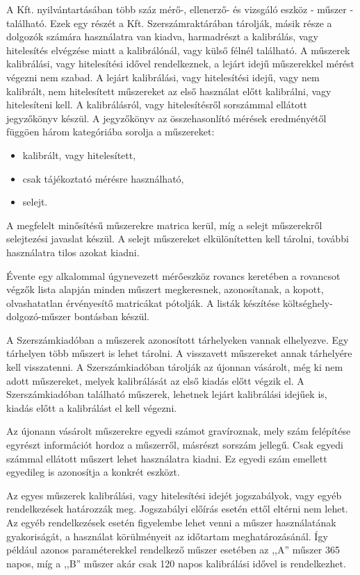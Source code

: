\documentclass[a4paper,12pt]{report}
\begin{document}
A Kft. nyilvántartásában több száz mérő-, ellenerző- és vizsgáló eszköz 
- műszer - található. Ezek egy részét a Kft. Szerszámraktárában tárolják, másik 
része a dolgozók számára használatra van kiadva, harmadrészt a kalibrálás, vagy 
hitelesítés elvégzése miatt a kalibrálónál, vagy külső félnél található. 
A műszerek kalibrálási, vagy hitelesítési idővel rendelkeznek, a lejárt idejű 
műszerekkel mérést végezni nem szabad. A lejárt kalibrálási, vagy hitelesítési 
idejű, vagy nem kalibrált, nem hitelesített műszereket az első használat előtt 
kalibrálni, vagy hitelesíteni kell. A kalibrálásról, vagy hitelesítésről 
sorszámmal ellátott jegyzőkönyv készül. A jegyzőkönyv az összehasonlító mérések 
eredményétől függöen három kategóriába sorolja a műszereket:
\begin{itemize}
 \item kalibrált, vagy hitelesített,
 \item csak tájékoztató mérésre használható,
 \item selejt.
\end{itemize}
A megfelelt minősítésű műszerekre matrica kerül, míg a selejt műszerekről 
selejtezési javaslat készül. A selejt műszereket elkülönítetten kell tárolni, 
további használatra tilos azokat kiadni.
 
Évente egy alkalommal úgynevezett mérőeszköz rovancs keretében a rovancsot 
végzők lista alapján minden műszert megkeresnek, azonosítanak, a kopott, 
olvashatatlan érvényesítő matricákat pótolják. A listák készítése 
költséghely-dolgozó-műszer bontásban készül.
 
A Szerszámkiadóban a műszerek azonosított tárhelyeken vannak elhelyezve. 
Egy tárhelyen több műszert is lehet tárolni. A visszavett műszereket annak 
tárhelyére kell visszatenni. A Szerszámkiadóban tárolják az újonnan vásárolt, 
még ki nem adott műszereket, melyek kalibrálását az első kiadás előtt végzik 
el. A Szerszámkiadóban található műszerek, lehetnek lejárt kalibrálási idejűek 
is, kiadás előtt a kalibrálást el kell végezni.

Az újonann vásárolt műszerekre egyedi számot gravíroznak, mely szám felépítése 
egyrészt információt hordoz a műszerről, másrészt sorszám jellegű. Csak egyedi 
számmal ellátott műszert lehet használatra kiadni. Ez egyedi szám emellett 
egyedileg is azonosítja a konkrét eszközt.

Az egyes műszerek kalibrálási, vagy hitelesítési idejét jogszabályok, vagy egyéb
rendelkezések határozzák meg. Jogszabályi előírás esetén ettől eltérni nem 
lehet. Az egyéb rendelkezések esetén figyelembe lehet venni a műszer 
használatának gyakoriságát, a használat körülményeit az időtartam 
meghatározásánál. 
Így például azonos paraméterekkel rendelkező műszer esetében az ,,A'' műszer
365 napos, míg a ,,B'' műszer akár csak 120 napos kalibrálási idővel is 
rendelkezhet.
\end{document}
